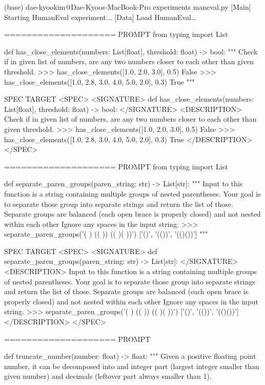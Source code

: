 (base) dae-kyookim@Dae-Kyoos-MacBook-Pro experiments %
maneval.py
[Main] Starting HumanEval experiment...
[Data] Load HumanEval…

====================
PROMPT
from typing import List


def has_close_elements(numbers: List[float], threshold: float) -> bool:
""" Check if in given list of numbers, are any two numbers closer to each other than
given threshold.
>>> has_close_elements([1.0, 2.0, 3.0], 0.5)
False
>>> has_close_elements([1.0, 2.8, 3.0, 4.0, 5.0, 2.0], 0.3)
True
"""


SPEC TARGET
<SPEC> <SIGNATURE> def has_close_elements(numbers: List[float], threshold: float) -> bool: </SIGNATURE> <DESCRIPTION> Check if in given list of numbers, are any two numbers closer to each other than given threshold. >>> has_close_elements([1.0, 2.0, 3.0], 0.5) False >>> has_close_elements([1.0, 2.8, 3.0, 4.0, 5.0, 2.0], 0.3) True </DESCRIPTION> </SPEC>

====================
PROMPT
from typing import List


def separate_paren_groups(paren_string: str) -> List[str]:
""" Input to this function is a string containing multiple groups of nested parentheses. Your goal is to
separate those group into separate strings and return the list of those.
Separate groups are balanced (each open brace is properly closed) and not nested within each other
Ignore any spaces in the input string.
>>> separate_paren_groups('( ) (( )) (( )( ))')
['()', '(())', '(()())']
"""


SPEC TARGET
<SPEC> <SIGNATURE> def separate_paren_groups(paren_string: str) -> List[str]: </SIGNATURE> <DESCRIPTION> Input to this function is a string containing multiple groups of nested parentheses. Your goal is to separate those group into separate strings and return the list of those. Separate groups are balanced (each open brace is properly closed) and not nested within each other Ignore any spaces in the input string. >>> separate_paren_groups('( ) (( )) (( )( ))') ['()', '(())', '(()())'] </DESCRIPTION> </SPEC>

====================
PROMPT


def truncate_number(number: float) -> float:
""" Given a positive floating point number, it can be decomposed into
and integer part (largest integer smaller than given number) and decimals
(leftover part always smaller than 1).


